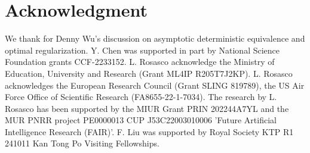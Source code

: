 \documentclass[11pt]{article}
\newcommand{\enableaddcontentsline}{%
  \let\addcontentsline\savedaddcontentsline
}
\begin{document}
\section*{Acknowledgment}
We thank for Denny Wu's discussion on asymptotic deterministic equivalence and optimal regularization.
Y. Chen was supported in part by National Science Foundation grants CCF-2233152.
L. Rosasco acknowledge the Ministry of Education, University and Research (Grant ML4IP R205T7J2KP). L. Rosasco acknowledges the European Research Council (Grant SLING 819789), the US Air Force Office of Scientific Research (FA8655-22-1-7034). The research by L. Rosasco has been supported by the MIUR Grant PRIN 202244A7YL and the MUR PNRR project PE0000013 CUP J53C22003010006 ’Future Artificial Intelligence Research (FAIR)’.
F. Liu was supported by Royal Society KTP R1 241011 Kan Tong Po Visiting Fellowships. 







\newpage
\appendix
\enableaddcontentsline
\tableofcontents
\newpage





















\end{document}
